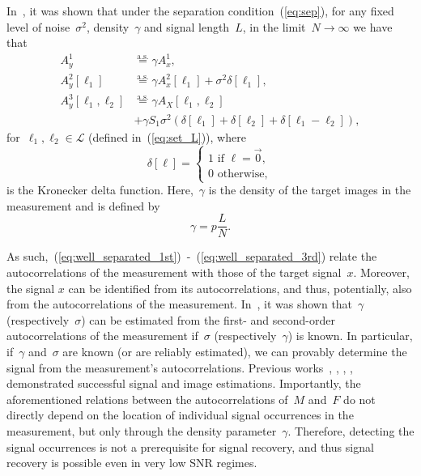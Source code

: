 \documentclass{article}
\begin{document}
In~\cite{bendory2019multi}, it was shown that under the separation condition~(\ref{eq:sep}), for any fixed level of noise~$\sigma^2$, density~$\gamma$ and signal length~$L$, in the limit~\mbox{$N \rightarrow \infty$} we have that
\begin{align}
\label{eq:well_separated_1st}
A_{y}^1 &\stackrel{\text{a.s.}}{=} \gamma A_{x}^1, \\
\label{eq:well_separated_2nd}
A_{y}^2 [\ell_1] &\stackrel{\text{a.s.}}{=} \gamma A_{x}^2 [\ell_1] + \sigma^2\delta[\ell_1], \\
\label{eq:well_separated_3rd}
A_{y}^3 [\ell_1, \ell_2] &\stackrel{\text{a.s.}}{=} \gamma A_{X} [\ell_1, \ell_2] \nonumber \\&+ \gamma S_1 \sigma^2 (\delta[\ell_1] + \delta[\ell_2] + \delta[\ell_1 - \ell_2]),
\end{align}
for~$\ell_1, \ell_2 \in \mathcal{L}$ (defined in~(\ref{eq:set_L})), where
\begin{equation}
\label{eq:delta}
\delta[\ell] = \begin{cases} 1 \text{ if } \ell = \vec{0}, \\ 0 \text{ otherwise}, \end{cases}
\end{equation}
is the Kronecker delta function. Here,~$\gamma$ is the density of the target images in the measurement and is defined by
\begin{equation}
\label{eq:gamma}
\gamma = p \frac{L}{N}.
\end{equation}

As such,~\mbox{(\ref{eq:well_separated_1st}) -~(\ref{eq:well_separated_3rd})} relate the autocorrelations of the measurement with those of the target signal~$x$. Moreover, the signal $x$ can be identified from its autocorrelations, and thus, potentially, also from the autocorrelations of the measurement. In~\cite{bendory2019multi}, it was shown that~$\gamma$ (respectively~$\sigma$) can be estimated from the first- and second-order autocorrelations of the measurement if~$\sigma$ (respectively~$\gamma$) is known. In particular, if~$\gamma$ and~$\sigma$ are known (or are reliably estimated), we can provably determine the signal from the measurement's autocorrelations. Previous works~\cite{bendory2019multi}, \cite{lan2020multi}, \cite{marshall2020image}, \cite{bendory2021multi}, \cite{kreymer2021two} demonstrated successful signal and image estimations. Importantly, the aforementioned relations between the autocorrelations of~$M$ and~$F$ do not directly depend on the location of individual signal occurrences in the measurement, but only through the density parameter~$\gamma$. Therefore, detecting the signal occurrences is not a prerequisite for signal recovery, and thus signal recovery is possible even in very low SNR regimes.
\end{document}
